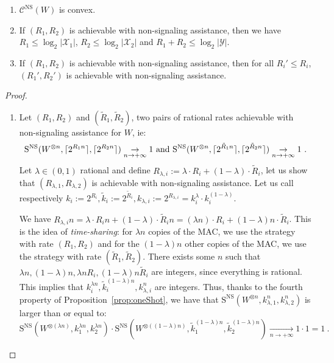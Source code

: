 \begin{corollary}
  \label{cor:asymptotic}
  \begin{enumerate}
      \item $\mathcal{C}^{\mathrm{NS}}(W)$ is convex.
      \item If $(R_1,R_2)$ is achievable with non-signaling assistance, then we have $R_1 \leq \log_2|\mathcal{X}_1|$, $R_2 \leq \log_2|\mathcal{X}_2|$ and $R_1 + R_2 \leq \log_2|\mathcal{Y}|$.
      \item If $(R_1,R_2)$ is achievable with non-signaling assistance, then for all $R_i' \leq R_i$, $(R_1',R_2')$ is achievable with non-signaling assistance.
  \end{enumerate}
\end{corollary}

\begin{proof}
  \begin{enumerate}
    \item Let $(R_1,R_2)$ and $(\tilde{R}_1,\tilde{R}_2)$, two pairs of rational rates achievable with non-signaling assistance for $W$, ie:
    \[ \mathrm{S}^{\mathrm{NS}}(W^{\otimes n},\lceil2^{R_1n}\rceil,\lceil2^{R_2n}\rceil) \underset{n \rightarrow +\infty}{\rightarrow} 1 \text{ and }\mathrm{S}^{\mathrm{NS}}(W^{\otimes n},\lceil2^{\tilde{R}_1n}\rceil,\lceil2^{\tilde{R}_2n}\rceil) \underset{n \rightarrow +\infty}{\rightarrow} 1 \ . \]
    Let $\lambda \in (0,1)$ rational and define $R_{\lambda,i} := \lambda \cdot R_i + (1-\lambda) \cdot \tilde{R}_i$, let us show that $(R_{\lambda,1},R_{\lambda,2})$ is achievable with non-signaling assistance. Let us call respectively $k_i:=2^{R_i}, \tilde{k}_i := 2^{\tilde{R}_i}, k_{\lambda,i} := 2^{R_{\lambda,i}} = k_i^{\lambda}\cdot k_i^{(1-\lambda)}$.

    We have $R_{\lambda,i}n = \lambda \cdot R_in + (1-\lambda) \cdot \tilde{R}_in = (\lambda n) \cdot R_i + (1-\lambda)n \cdot \tilde{R}_i$. This is the idea of \emph{time-sharing}: for $\lambda n$ copies of the MAC, we use the strategy with rate $(R_1,R_2)$ and for the $(1-\lambda)n$ other copies of the MAC, we use the strategy with rate $(\tilde{R}_1,\tilde{R}_2)$. There exists some $n$ such that $\lambda n,(1-\lambda)n,\lambda n R_i,(1-\lambda)n \tilde{R}_i$ are integers, since everything is rational. This implies that $k_i^{\lambda n},\tilde{k}_i^{(1-\lambda)n},k_{\lambda,i}^n$ are integers. Thus, thanks to the fourth property of Proposition~\ref{prop:oneShot}, we have that $\mathrm{S}^{\mathrm{NS}}(W^{\otimes n},k^n_{\lambda,1},k^n_{\lambda, 2})$ is larger than or equal to:
\[ \mathrm{S}^{\mathrm{NS}}(W^{\otimes (\lambda n)}, k_1^{\lambda n}, k_2^{\lambda n}) \cdot \mathrm{S}^{\mathrm{NS}}(W^{\otimes ((1-\lambda) n)}, \tilde{k}_1^{(1-\lambda) n}, \tilde{k}_2^{(1-\lambda) n}) \underset{n \rightarrow +\infty}{\rightarrow} 1 \cdot 1 = 1  \ .\]


\end{enumerate}
\end{proof}
